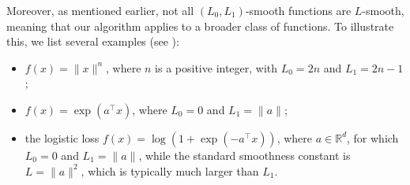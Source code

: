 \documentclass[runningheads]{llncs}
\begin{document}
	Moreover, as mentioned earlier, not all $(L_0, L_1)$-smooth functions are $L$-smooth, meaning that our algorithm applies to a broader class of functions. 
	To illustrate this, we list several examples (see \cite{gorbunov2024methods}):
	\begin{itemize}
		\item $f(x) = \|x\|^n$, where $n$ is a positive integer, with $L_0 = 2n$ and $L_1 = 2n - 1$;
		\item $f(x) = \exp(a^\top x)$, where $L_0 = 0$ and $L_1 = \|a\|$;
		\item the logistic loss $f(x) = \log(1 + \exp(-a^\top x))$, where $a \in \mathbb{R}^d$, for which $L_0 = 0$ and $L_1 = \|a\|$, while the standard smoothness constant is $L = \|a\|^2$, which is typically much larger than $L_1$.
	\end{itemize}
	
\end{document}
